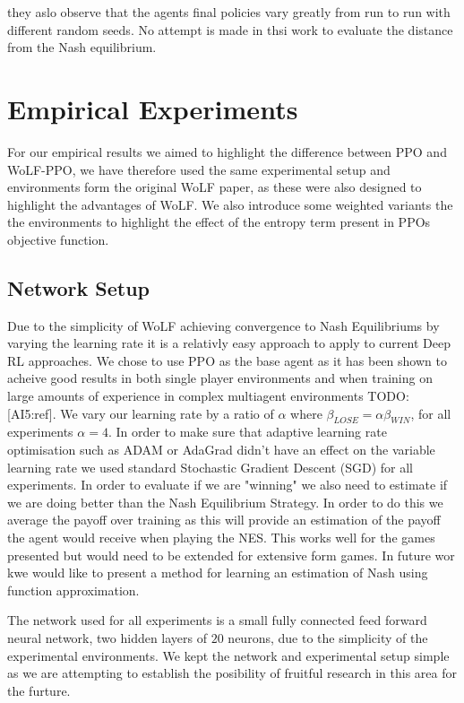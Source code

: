 \documentclass[conference]{IEEEtran}
\newcommand\TODO[1]{{\color{red}TODO: #1}}
\begin{document}
they aslo observe that the agents final policies vary greatly from run to run with different random seeds. No attempt is made in thsi work to evaluate the distance from the Nash equilibrium. 

\section{Empirical Experiments}

For our empirical results we aimed to highlight the difference between PPO and WoLF-PPO, we have therefore used the same experimental setup and environments form the original WoLF paper, as these were also designed to highlight the advantages of WoLF. We also introduce some weighted variants the the environments to highlight the effect of the entropy term present in PPOs objective function.

\subsection{Network Setup}

Due to the simplicity of WoLF achieving convergence to Nash Equilibriums by varying the learning rate it is a relativly easy approach to apply to current Deep RL approaches. We chose to use PPO as the base agent as it has been shown to acheive good results in both single player environments and when training on large amounts of experience in complex multiagent environments \TODO{[AI5:ref]}. We vary our learning rate by a ratio of $\alpha$ where $\beta_{LOSE} = \alpha\beta_{WIN}$, for all experiments $\alpha = 4$. In order to make sure that adaptive learning rate optimisation such as ADAM or AdaGrad didn't have an effect on the variable learning rate we used standard Stochastic Gradient Descent (SGD) for all experiments. In order to evaluate if we are "winning" we also need to estimate if we are doing better than the Nash Equilibrium Strategy. In order to do this we average the payoff over training as this will provide an estimation of the payoff the agent would receive when playing the NES. This works well for the games presented but would need to be extended for extensive form games. In future wor kwe would like to present a method for learning an estimation of Nash using function approximation.

The network used for all experiments is a small fully connected feed forward neural network, two hidden layers of $20$ neurons, due to the simplicity of the experimental environments. We kept the network and experimental setup simple as we are attempting to establish the posibility of fruitful research in this area for the furture.
\end{document}
